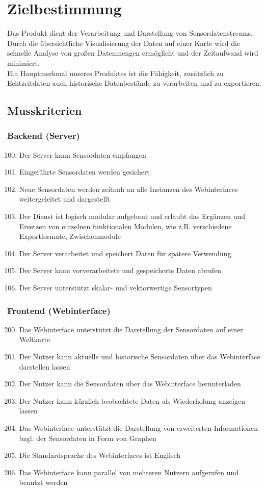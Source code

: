 \chapter{Zielbestimmung}
Das Produkt dient der Verarbeitung und Darstellung von Sensordatenstreams. Durch die übersichtliche Visualisierung der Daten auf einer Karte wird die schnelle Analyse von großen Datenmengen ermöglicht und der Zeitaufwand wird minimiert.\\
Ein Hauptmerkmal unseres Produktes ist die Fähigkeit, zusätzlich zu Echtzeitdaten auch historische Datenbestände zu verarbeiten und zu exportieren.
\section{Musskriterien}
\subsection{Backend (Server)}
\begin{enumerate}[label=\textbf{MK\arabic{enumi}0}]
	\setcounter{enumi}{99}
	\item Der Server kann Sensordaten empfangen
	\item Eingeführte Sensordaten werden gesichert
	\item Neue Sensordaten werden zeitnah an alle Instanzen des Webinterfaces weitergeleitet und dargestellt
	\item Der Dienst ist logisch modular aufgebaut und erlaubt das Ergänzen und Ersetzen von einzelnen funktionalen Modulen, wie z.B. verschiedene Exportformate, Zwischenmodule
	\item Der Server verarbeitet und speichert Daten für spätere Verwendung
	\item Der Server kann vorverarbeitete und gespeicherte Daten abrufen
	\item Der Server unterstützt skalar- und vektorwertige Sensortypen
\end{enumerate}
\subsection{Frontend (Webinterface)}
\begin{enumerate}[label=\textbf{MK\arabic{enumi}0}]
	\setcounter{enumi}{199}
	\item Das Webinterface unterstützt die Darstellung der Sensordaten auf einer Weltkarte
	\item Der Nutzer kann aktuelle und historische Sensordaten über das Webinterface darstellen lassen
	\item Der Nutzer kann die Sensordaten über das Webinterface herunterladen
	\item Der Nutzer kann kürzlich beobachtete Daten als Wiederholung anzeigen lassen
	\item Das Webinterface unterstützt die Darstellung von erweiterten Informationen bzgl. der Sensordaten in Form von Graphen
	\item Die Standardsprache des Webinterfaces ist Englisch
	\item Das Webinterface kann parallel von mehreren Nutzern aufgerufen und benutzt werden
\end{enumerate}

